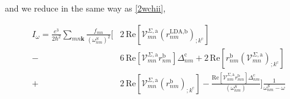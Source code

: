 \documentclass[11pt]{article}
\begin{document}
and we reduce in the same way as \eqref{2wchii},

\begin{align}\label{wchii_simplified}
I_{\omega}
= \frac{e^3}{2\hbar^2}\sum_{mn\mathbf{k}}\frac{f_{mn}}{(\omega^{S}_{nm})^{2}}
\Biggl[
  &2\,\mathrm{Re}\left[\mathcal{V}^{\Sigma,\text{a}}_{mn}\left(r^{\text{LDA},\text{b}}_{nm}\right)_{;k^{\text{c}}}\right]\nonumber\\
- &6\,\mathrm{Re}\left[\mathcal{V}^{\Sigma,\text{a}}_{mn}r^{\text{b}}_{nm}\right]\Delta^{\text{c}}_{nm} 
+  2\,\mathrm{Re}\left[r^{\text{b}}_{nm}\left(\mathcal{V}^{\Sigma,\text{a}}_{mn}\right)_{;k^{\text{c}}}\right]\nonumber\\
+ &2\,\mathrm{Re}\left[\mathcal{V}^{\Sigma,\text{a}}_{mn}\left(r^{\text{b}}_{nm}\right)_{;k^{\text{c}}}\right]
- \frac{\mathrm{Re}\left[\mathcal{V}^{\Sigma,\text{a}}_{nm}r^{\text{b}}_{mn}\right]\Delta_{nm}^{\text{c}}}{(\omega^{S}_{nm})}
\Biggr]\frac{1}{\omega^{S}_{nm}-\omega}
\end{align}
\end{document}
